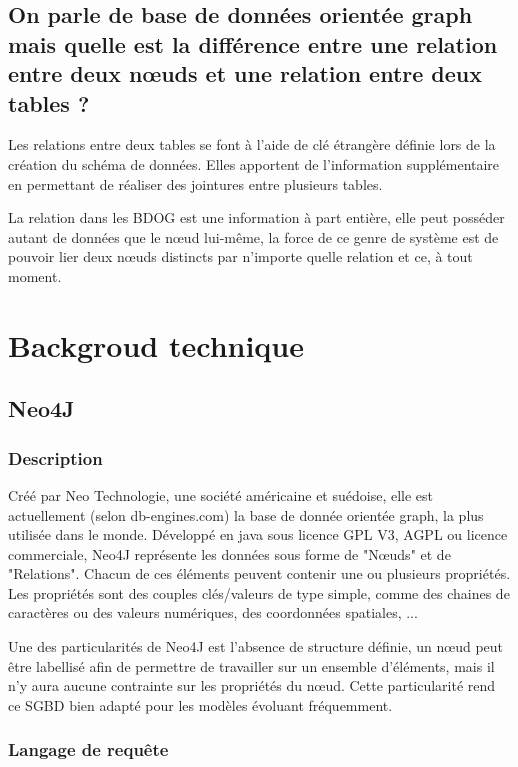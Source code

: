 \documentclass[a4paper,fleqn,12pt]{report}
\begin{document}
\section*{On parle de base de données orientée graph mais quelle est la différence entre une relation entre deux nœuds et une relation entre deux tables ?}
Les relations entre deux tables se font à l’aide de clé étrangère définie lors de la création du schéma de données. Elles apportent de l’information supplémentaire en permettant de réaliser des jointures entre plusieurs tables.

La relation dans les BDOG est une information à part entière, elle peut posséder autant de données que le nœud lui-même, la force de ce genre de système est de pouvoir lier deux nœuds distincts par n’importe quelle relation et ce, à tout moment.

\chapter{Backgroud technique}
\section{Neo4J}

\subsection{Description}

Créé par Neo Technologie, une société américaine et suédoise, elle est actuellement (selon db-engines.com) la base de donnée orientée graph, la plus utilisée dans le monde. Développé en java sous licence GPL V3, AGPL ou licence commerciale, Neo4J représente les données sous forme de "Nœuds" et de "Relations". Chacun de ces éléments peuvent contenir une ou plusieurs propriétés. Les propriétés sont des couples clés/valeurs de type simple, comme des chaines de caractères ou des valeurs numériques, des coordonnées spatiales, ...

Une des particularités de Neo4J est l’absence de structure définie, un nœud peut être labellisé afin de permettre de travailler sur un ensemble d’éléments, mais il n’y aura aucune contrainte sur les propriétés du nœud. Cette particularité rend ce SGBD bien adapté pour les modèles évoluant fréquemment.


\subsection{Langage de requête}
\end{document}

